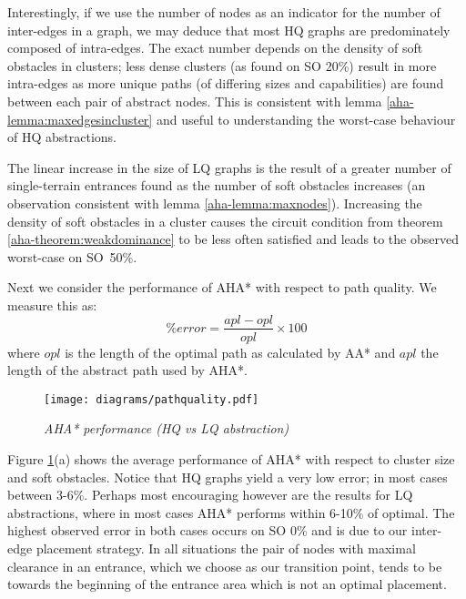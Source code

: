 \par \indent
Interestingly, if we use the number of nodes as an indicator for the number of inter-edges in a graph, we may deduce that most HQ graphs are predominately composed of intra-edges. 
The exact number depends on the density of soft obstacles in clusters; less dense clusters (as found on SO 20\%) result in more intra-edges as more unique paths (of differing sizes and capabilities) are found between each pair of abstract nodes. 
This is consistent with lemma \ref{aha-lemma:maxedgesincluster} and useful to understanding the worst-case behaviour of HQ abstractions.
\par \indent
The linear increase in the size of LQ graphs is the result of a greater number of single-terrain entrances found as the number of soft obstacles increases (an observation consistent with lemma \ref{aha-lemma:maxnodes}).
Increasing the density of soft obstacles in a cluster causes the circuit condition from theorem \ref{aha-theorem:weakdominance} to be less often satisfied and leads to the observed worst-case on SO~50\%.
\par \indent
Next we consider the performance of AHA* with respect to path quality. We measure this as:
$$ \%error = \frac{apl - opl}{opl} \times 100 $$ where $opl$ is the length of the optimal path as calculated by AA* and $apl$ the length of the abstract path used by AHA*.
\begin{figure}[htbp]
	\vspace{-15pt}
	\caption{\small{\emph{AHA* performance (HQ vs LQ abstraction)}}}
	\begin{center}
		       \texttt{[image: diagrams/pathquality.pdf]}
	\end{center}
	\label{aha-fig:pathquality}
	\vspace{-7pt}
\end{figure}
\par \indent
Figure \ref{aha-fig:pathquality}(a) shows the average performance of AHA* with respect to cluster size and soft obstacles.  
Notice that HQ graphs yield a very low error; in most cases between 3-6\%. 
Perhaps most encouraging however are the results for LQ abstractions, where in most cases AHA* performs within 6-10\% of optimal. 
The highest observed error in both cases occurs on SO 0\% and is due to our inter-edge placement strategy.
In all situations the pair of nodes with maximal clearance in an entrance, which we choose as our transition point, tends to be towards the beginning of the entrance area which is not an optimal placement.
